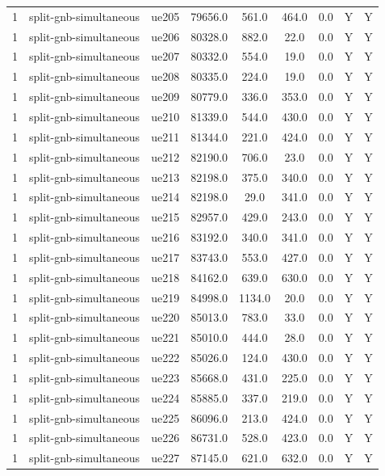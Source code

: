 \begin{table}[ht]
\begin{tabular}{|c|c|c|c|c|c|c|c|c|}
1 & split-gnb-simultaneous & ue205 & 79656.0 & 561.0 & 464.0 & 0.0 & Y & Y \\
1 & split-gnb-simultaneous & ue206 & 80328.0 & 882.0 & 22.0 & 0.0 & Y & Y \\
1 & split-gnb-simultaneous & ue207 & 80332.0 & 554.0 & 19.0 & 0.0 & Y & Y \\
1 & split-gnb-simultaneous & ue208 & 80335.0 & 224.0 & 19.0 & 0.0 & Y & Y \\
1 & split-gnb-simultaneous & ue209 & 80779.0 & 336.0 & 353.0 & 0.0 & Y & Y \\
1 & split-gnb-simultaneous & ue210 & 81339.0 & 544.0 & 430.0 & 0.0 & Y & Y \\
1 & split-gnb-simultaneous & ue211 & 81344.0 & 221.0 & 424.0 & 0.0 & Y & Y \\
1 & split-gnb-simultaneous & ue212 & 82190.0 & 706.0 & 23.0 & 0.0 & Y & Y \\
1 & split-gnb-simultaneous & ue213 & 82198.0 & 375.0 & 340.0 & 0.0 & Y & Y \\
1 & split-gnb-simultaneous & ue214 & 82198.0 & 29.0 & 341.0 & 0.0 & Y & Y \\
1 & split-gnb-simultaneous & ue215 & 82957.0 & 429.0 & 243.0 & 0.0 & Y & Y \\
1 & split-gnb-simultaneous & ue216 & 83192.0 & 340.0 & 341.0 & 0.0 & Y & Y \\
1 & split-gnb-simultaneous & ue217 & 83743.0 & 553.0 & 427.0 & 0.0 & Y & Y \\
1 & split-gnb-simultaneous & ue218 & 84162.0 & 639.0 & 630.0 & 0.0 & Y & Y \\
1 & split-gnb-simultaneous & ue219 & 84998.0 & 1134.0 & 20.0 & 0.0 & Y & Y \\
1 & split-gnb-simultaneous & ue220 & 85013.0 & 783.0 & 33.0 & 0.0 & Y & Y \\
1 & split-gnb-simultaneous & ue221 & 85010.0 & 444.0 & 28.0 & 0.0 & Y & Y \\
1 & split-gnb-simultaneous & ue222 & 85026.0 & 124.0 & 430.0 & 0.0 & Y & Y \\
1 & split-gnb-simultaneous & ue223 & 85668.0 & 431.0 & 225.0 & 0.0 & Y & Y \\
1 & split-gnb-simultaneous & ue224 & 85885.0 & 337.0 & 219.0 & 0.0 & Y & Y \\
1 & split-gnb-simultaneous & ue225 & 86096.0 & 213.0 & 424.0 & 0.0 & Y & Y \\
1 & split-gnb-simultaneous & ue226 & 86731.0 & 528.0 & 423.0 & 0.0 & Y & Y \\
1 & split-gnb-simultaneous & ue227 & 87145.0 & 621.0 & 632.0 & 0.0 & Y & Y \\

\end{tabular}
\end{table}
